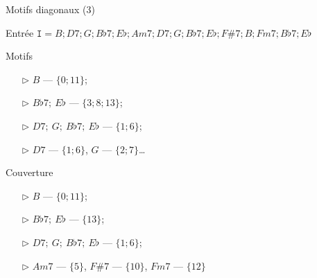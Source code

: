 \documentclass[10pt]{beamer}
\begin{document}
\begin{frame}{Motifs diagonaux (3)}
\begin{block}{Entrée}
$\texttt{I}=
B;D 7;G;B\flat 7;E\flat;A m7;D 7;G;B\flat 7;E\flat;F\# 7;B;F m7;B\flat 7;E\flat$
\end{block} \pause

\begin{block}{Motifs}
\begin{itemize}
\item[$\triangleright$] $B$ --- $\{0;11\}$;
\item[$\triangleright$] $B\flat 7;~E\flat$ --- $\{3;8;13\}$;
\item[$\triangleright$] $D7;~G;~B\flat 7;~E\flat$ --- $\{1;6\}$; \pause
\item[$\triangleright$] $D7$ --- $\{1;6\}$, $G$ --- $\{2;7\}$\dots
\end{itemize}
\end{block} \pause

\begin{block}{Couverture}
\begin{itemize}
\item[$\triangleright$] $B$ --- $\{0;11\}$;
\item[$\triangleright$] $B\flat 7;~E\flat$ --- $\{13\}$;
\item[$\triangleright$] $D7;~G;~B\flat 7;~E\flat$ --- $\{1;6\}$;
\item[$\triangleright$] $Am7$ --- $\{5\}$, $F\#7$ --- $\{10\}$, $Fm7$ --- $\{12\}$
\end{itemize}
\end{block}
\end{frame}
\end{document}
